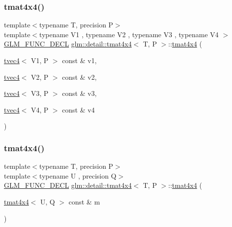 \subsubsection{\texorpdfstring{tmat4x4()}{tmat4x4()}\hspace{0.1cm}{\footnotesize\ttfamily [9/22]}}
{\footnotesize\ttfamily template$<$typename T, precision P$>$ \\
template$<$typename V1 , typename V2 , typename V3 , typename V4 $>$ \\
\hyperlink{setup_8hpp_ab2d052de21a70539923e9bcbf6e83a51}{G\+L\+M\+\_\+\+F\+U\+N\+C\+\_\+\+D\+E\+CL} \hyperlink{structglm_1_1detail_1_1tmat4x4}{glm\+::detail\+::tmat4x4}$<$ T, P $>$\+::\hyperlink{structglm_1_1detail_1_1tmat4x4}{tmat4x4} (\begin{DoxyParamCaption}\item[{\hyperlink{structglm_1_1detail_1_1tvec4}{tvec4}$<$ V1, P $>$ const \&}]{v1,  }\item[{\hyperlink{structglm_1_1detail_1_1tvec4}{tvec4}$<$ V2, P $>$ const \&}]{v2,  }\item[{\hyperlink{structglm_1_1detail_1_1tvec4}{tvec4}$<$ V3, P $>$ const \&}]{v3,  }\item[{\hyperlink{structglm_1_1detail_1_1tvec4}{tvec4}$<$ V4, P $>$ const \&}]{v4 }\end{DoxyParamCaption})}

\mbox{\label{structglm_1_1detail_1_1tmat4x4_a075d7a65803598d3f219f23ca08ba21f}} 
\subsubsection{\texorpdfstring{tmat4x4()}{tmat4x4()}\hspace{0.1cm}{\footnotesize\ttfamily [10/22]}}
{\footnotesize\ttfamily template$<$typename T, precision P$>$ \\
template$<$typename U , precision Q$>$ \\
\hyperlink{setup_8hpp_ab2d052de21a70539923e9bcbf6e83a51}{G\+L\+M\+\_\+\+F\+U\+N\+C\+\_\+\+D\+E\+CL} \hyperlink{structglm_1_1detail_1_1tmat4x4}{glm\+::detail\+::tmat4x4}$<$ T, P $>$\+::\hyperlink{structglm_1_1detail_1_1tmat4x4}{tmat4x4} (\begin{DoxyParamCaption}\item[{\hyperlink{structglm_1_1detail_1_1tmat4x4}{tmat4x4}$<$ U, Q $>$ const \&}]{m }\end{DoxyParamCaption})\hspace{0.3cm}{\ttfamily [explicit]}}

